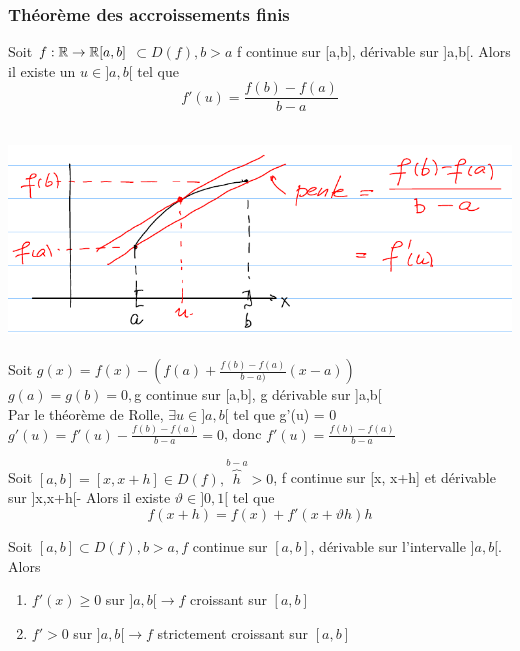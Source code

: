 \documentclass[12pt,a4paper]{article}
\begin{document}
{\subsubsection{Théorème des accroissements finis}
\begin{boite}
	\Theoreme Soit $f:\mathbb{R} \to \mathbb{R} [a,b]$ $\subset D(f), b > a$ f continue sur [a,b], dérivable sur ]a,b[. Alors il existe un $u \in ]a,b[$ tel que 
	\begin{equation}
		f'(u) = \frac{f(b)-f(a)}{b-a}
	\end{equation}
\end{boite}
\\
 \includegraphics[scale=0.7]{illustrations_Analyse/acc_finis}\\
\\
Soit $g(x) = f(x) - (f(a) + \frac{f(b)-f(a)}{b-a)}(x-a))$\\
$g(a)=g(b) = 0, $g continue sur [a,b], g dérivable sur ]a,b[\\
Par le théorème de Rolle, $\exists u \in ]a,b[$ tel que g'(u) = 0\\
$g'(u) = f'(u) - \frac{f(b)-f(a)}{b-a} = 0$, donc $f'(u) = \frac{f(b)-f(a)}{b-a}$\\
\begin{boite}
 Soit $[a,b] = [x,x+h] \in D(f), \overbrace{h}^{b-a} > 0$, f continue sur [x, x+h] 
et dérivable sur ]x,x+h[- Alors il existe $\vartheta \in ]0,1[$ tel que
\begin{equation}
f(x+h) = f(x) + f'(x + \vartheta h)h
\end{equation}
\end{boite}
\begin{boite}
	 Soit $[a,b] \subset D(f), b > a, f$ continue sur $[a,b]$, dérivable sur l'intervalle $]a,b[$. Alors
	\begin{enumerate}[label=\roman*)]
		\item $f'(x) \geq 0$ sur $]a,b[ \to f$ croissant sur $[a,b]$
		\item $f' > 0 $ sur $]a,b[\to f$ strictement croissant sur $[a,b]$

\end{enumerate}
\end{boite}}
\end{document}
